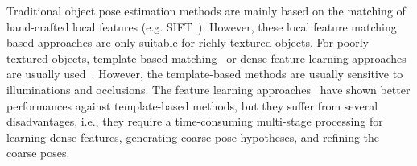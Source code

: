\documentclass[conference]{IEEEtran}
\begin{document}

Traditional object pose estimation methods are mainly based on the matching of hand-crafted local features (e.g. SIFT~\cite{SIFT_Lowe}). However, these local feature matching based approaches are only suitable for richly textured objects. For poorly textured objects, template-based matching~\cite{ACCV12,DBLP:conf/eccv/TejaniTKK14,DBLP:conf/iccv/Rios-CabreraT13} or dense feature learning approaches are usually used~\cite{ECCV14,ICCV15,CVPR17,CVPR17_2}. However, the template-based methods are usually sensitive to illuminations and occlusions.  
The feature learning approaches~\cite{ECCV14,ICCV15,CVPR17,CVPR17_2} have shown better performances against template-based methods, but they suffer from several disadvantages, i.e., 
they require a time-consuming multi-stage processing for learning dense features, generating coarse pose hypotheses, and refining the coarse poses. 
\end{document}
